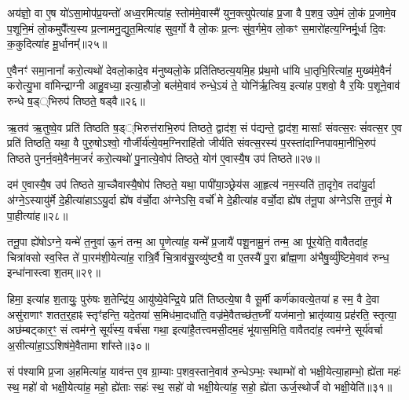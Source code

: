 {\anuvakamend[{भू॒या॒स्त॒ स्व॒स्तये\-ऽग्ने॑ पुष्यासं धृ॒षद्व॑र्ण॒मेका॒न्नत्रि॒ꣳ॒शच्च॑॥६॥}]}

अय॑ज्ञो॒ वा ए॒ष यो॑\-ऽसा॒मोप॑प्र॒यन्तो॑ अध्व॒रमित्या॑ह॒ स्तोम॑मे॒वास्मै॑ युन॒क्त्युपेत्या॑ह प्र॒जा वै प॒शव॒ उपे॒मं लो॒कं प्र॒जामे॒व प॒शूनि॒मं लो॒कमुपै᳚त्य॒स्य प्र॒त्नामनु॒द्युत॒मित्या॑ह सुव॒र्गो वै लो॒कः प्र॒त्नः सु॑व॒र्गमे॒व लो॒कꣳ स॒मारो॑हत्य॒ग्निर्मू॒र्धा दि॒वः क॒कुदित्या॑ह मू॒र्धानम्᳚॥२५॥

ए॒वैनꣳ॑ समा॒नानां᳚ करो॒त्यथो॑ देवलो॒कादे॒व म॑नुष्यलो॒के प्रति॑तिष्ठत्य॒यमि॒ह प्र॑थ॒मो धा॑यि धा॒तृभि॒रित्या॑ह॒ मुख्य॑मे॒वैनं॑ करोत्यु॒भा वा॑मिन्द्राग्नी आहु॒वध्या॒ इत्या॒हौजो॒ बल॑मे॒वाव॑ रुन्धे॒\-ऽयं ते॒ योनि॑र्\mbox{}ऋ॒त्विय॒ इत्या॑ह प॒शवो॒ वै र॒यिः प॒शूने॒वाव॑ रुन्धे ष॒ड््भिरुप॑ तिष्ठते॒ षड्वै॥२६॥

ऋ॒तव॑ ऋ॒तुष्वे॒व प्रति॑ तिष्ठति ष॒ड््भिरुत्त॑राभि॒रुप॑ तिष्ठते॒ द्वाद॑श॒ सं प॑द्यन्ते॒ द्वाद॑श॒ मासाः᳚ संवत्स॒रः सं॑वत्स॒र ए॒व प्रति॑ तिष्ठति॒ यथा॒ वै पुरु॒षो\-ऽश्वो॒ गौर्जीर्य॑त्ये॒वम॒ग्निराहि॑तो जीर्यति संवत्स॒रस्य॑ प॒रस्ता॑दाग्निपावमा॒नीभि॒रुप॑ तिष्ठते पुनर्न॒वमे॒वैन॑म॒जरं॑ करो॒त्यथो॑ पु॒नात्ये॒वोप॑ तिष्ठते॒ योग॑ ए॒वास्यै॒ष उप॑ तिष्ठते॥२७॥

दम॑ ए॒वास्यै॒ष उप॑ तिष्ठते या॒च्ञैवास्यै॒षोप॑ तिष्ठते॒ यथा॒ पापी॑या॒ञ्छ्रेय॑स आ॒हृत्य॑ नम॒स्यति॑ ता॒दृगे॒व तदा॑यु॒र्दा अ॑ग्ने॒\-ऽस्यायु॑र्मे दे॒हीत्या॑हा\-ऽ\-ऽयु॒र्दा ह्ये॑ष व॑र्चो॒दा अ॑ग्ने\-ऽसि॒ वर्चो॑ मे दे॒हीत्या॑ह वर्चो॒दा ह्ये॑ष त॑नू॒पा अ॑ग्ने\-ऽसि त॒नुवं॑ मे पा॒हीत्या॑ह॥२८॥

तनू॒पा ह्ये॑षो\-ऽग्ने॒ यन्मे॑ त॒नुवा॑ ऊ॒नं तन्म॒ आ पृ॒णेत्या॑ह॒ यन्मे᳚ प्र॒जायै॑ पशू॒नामू॒नं तन्म॒ आ पू॑र॒येति॒ वावैतदा॑ह॒ चित्रा॑वसो स्व॒स्ति ते॑ पा॒रम॑शी॒येत्या॑ह॒ रात्रि॒र्वै चि॒त्राव॑सु॒रव्यु॑ष्ट्यै॒ वा ए॒तस्यै॑ पु॒रा ब्रा᳚ह्म॒णा अ॑भैषु॒र्व्यु॑ष्टिमे॒वाव॑ रुन्ध॒ इन्धा॑नास्त्वा श॒तम्॥२९॥

हिमा॒ इत्या॑ह श॒तायुः॒ पुरु॑षः श॒तेन्द्रि॑य॒ आयु॑ष्ये॒वेन्द्रि॒ये प्रति॑ तिष्ठत्ये॒षा वै सू॒र्मी कर्ण॑कावत्ये॒तया॑ ह स्म॒ वै दे॒वा असु॑राणाꣳ शतत॒र्॒\mbox{}हाꣴ स्तृꣳ॑हन्ति॒ यदे॒तया॑ स॒मिध॑मा॒दधा॑ति॒ वज्र॑मे॒वैतच्छ॑त॒घ्नीं यज॑मानो॒ भ्रातृ॑व्याय॒ प्रह॑रति॒ स्तृत्या॒ अछ॑म्बट्कार॒ꣳ॒ सं त्वम॑ग्ने॒ सूर्य॑स्य॒ वर्च॑सा गथा॒ इत्या॑है॒तत्त्वमसी॒दम॒हं भू॑यास॒मिति॒ वावैतदा॑ह॒ त्वम॑ग्ने॒ सूर्य॑वर्चा अ॒सीत्या॑हा॒\-ऽ\-ऽशिष॑मे॒वैतामा शा᳚स्ते॥३०॥

{\anuvakamend[{मू॒र्धानं॒ वै तिष्ठ॑त आह श॒तम॒हꣳ षोड॑श च॥७॥}]}

सं प॑श्यामि प्र॒जा अ॒हमित्या॑ह॒ याव॑न्त ए॒व ग्रा॒म्याः प॒शव॒स्ताने॒वाव॑ रु॒न्धे\-ऽम्भः॒ स्थाम्भो॑ वो भक्षी॒येत्या॒हाम्भो॒ ह्ये॑ता महः॑ स्थ॒ महो॑ वो भक्षी॒येत्या॑ह॒ महो॒ ह्ये॑ताः सहः॑ स्थ॒ सहो॑ वो भक्षी॒येत्या॑ह॒ सहो॒ ह्ये॑ता ऊर्ज॒स्थोर्जं॑ वो भक्षी॒येति॑॥३१॥

